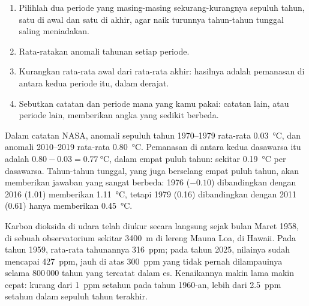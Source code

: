\begin{method}
\begin{enumerate}
  \item Pilihlah dua periode yang masing-masing sekurang-kurangnya sepuluh
        tahun, satu di awal dan satu di akhir, agar naik turunnya
        tahun-tahun tunggal saling meniadakan.
  \item Rata-ratakan anomali tahunan setiap periode.
  \item Kurangkan rata-rata awal dari rata-rata akhir: hasilnya adalah
        pemanasan di antara kedua periode itu, dalam derajat.
  \item Sebutkan catatan dan periode mana yang kamu pakai: catatan lain,
        atau periode lain, memberikan angka yang sedikit berbeda.
\end{enumerate}
\end{method}

\begin{example}
Dalam catatan NASA, anomali sepuluh tahun 1970--1979 rata-rata
\qty{0.03}{\degreeCelsius}, dan anomali 2010--2019 rata-rata
\qty{0.80}{\degreeCelsius}. Pemanasan di antara kedua dasawarsa itu adalah
$0.80 - 0.03 = \qty{0.77}{\degreeCelsius}$, dalam empat puluh tahun:
sekitar \qty{0.19}{\degreeCelsius} per dasawarsa. Tahun-tahun tunggal,
yang juga berselang empat puluh tahun, akan memberikan jawaban yang sangat
berbeda: 1976 ($-0.10$) dibandingkan dengan 2016 (1.01) memberikan
\qty{1.11}{\degreeCelsius}, tetapi 1979 (0.16) dibandingkan dengan 2011
(0.61) hanya memberikan \qty{0.45}{\degreeCelsius}.
\end{example}

Karbon dioksida di udara telah diukur secara langsung sejak bulan Maret
1958, di sebuah observatorium sekitar \qty{3400}{m} di lereng 
Mauna Loa, di Hawaii. Pada tahun 1959, rata-rata tahunannya
\qty{316}{ppm}; pada tahun 2025, nilainya sudah mencapai \qty{427}{ppm},
jauh di atas \qty{300}{ppm} yang tidak pernah dilampauinya selama
800\,000 tahun yang tercatat dalam es. Kenaikannya makin lama makin cepat:
kurang dari \qty{1}{ppm} setahun pada tahun 1960-an, lebih dari
\qty{2.5}{ppm} setahun dalam sepuluh tahun terakhir.

